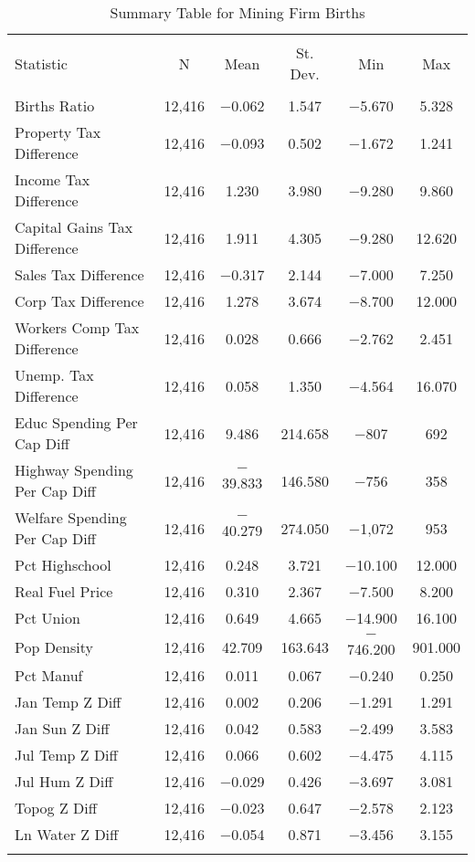
\begin{table}[!htbp] \centering 
  \caption{Summary Table for  Mining Firm Births} 
  \label{21summary} 
\begin{tabular}{@{\extracolsep{5pt}}lccccc} 
\\[-1.8ex]\hline 
\hline \\[-1.8ex] 
Statistic & \multicolumn{1}{c}{N} & \multicolumn{1}{c}{Mean} & \multicolumn{1}{c}{St. Dev.} & \multicolumn{1}{c}{Min} & \multicolumn{1}{c}{Max} \\ 
\hline \\[-1.8ex] 
Births Ratio & 12,416 & $-$0.062 & 1.547 & $-$5.670 & 5.328 \\ 
Property Tax Difference & 12,416 & $-$0.093 & 0.502 & $-$1.672 & 1.241 \\ 
Income Tax Difference & 12,416 & 1.230 & 3.980 & $-$9.280 & 9.860 \\ 
Capital Gains Tax Difference & 12,416 & 1.911 & 4.305 & $-$9.280 & 12.620 \\ 
Sales Tax Difference & 12,416 & $-$0.317 & 2.144 & $-$7.000 & 7.250 \\ 
Corp Tax Difference & 12,416 & 1.278 & 3.674 & $-$8.700 & 12.000 \\ 
Workers Comp Tax Difference & 12,416 & 0.028 & 0.666 & $-$2.762 & 2.451 \\ 
Unemp. Tax Difference & 12,416 & 0.058 & 1.350 & $-$4.564 & 16.070 \\ 
Educ Spending Per Cap Diff & 12,416 & 9.486 & 214.658 & $-$807 & 692 \\ 
Highway Spending Per Cap Diff & 12,416 & $-$39.833 & 146.580 & $-$756 & 358 \\ 
Welfare Spending Per Cap Diff & 12,416 & $-$40.279 & 274.050 & $-$1,072 & 953 \\ 
Pct Highschool & 12,416 & 0.248 & 3.721 & $-$10.100 & 12.000 \\ 
Real Fuel Price & 12,416 & 0.310 & 2.367 & $-$7.500 & 8.200 \\ 
Pct Union & 12,416 & 0.649 & 4.665 & $-$14.900 & 16.100 \\ 
Pop Density & 12,416 & 42.709 & 163.643 & $-$746.200 & 901.000 \\ 
Pct Manuf & 12,416 & 0.011 & 0.067 & $-$0.240 & 0.250 \\ 
Jan Temp Z Diff & 12,416 & 0.002 & 0.206 & $-$1.291 & 1.291 \\ 
Jan Sun Z Diff & 12,416 & 0.042 & 0.583 & $-$2.499 & 3.583 \\ 
Jul Temp Z Diff & 12,416 & 0.066 & 0.602 & $-$4.475 & 4.115 \\ 
Jul Hum Z Diff & 12,416 & $-$0.029 & 0.426 & $-$3.697 & 3.081 \\ 
Topog Z Diff & 12,416 & $-$0.023 & 0.647 & $-$2.578 & 2.123 \\ 
Ln Water Z Diff & 12,416 & $-$0.054 & 0.871 & $-$3.456 & 3.155 \\ 
\hline \\[-1.8ex] 
\end{tabular} 
\end{table} 
